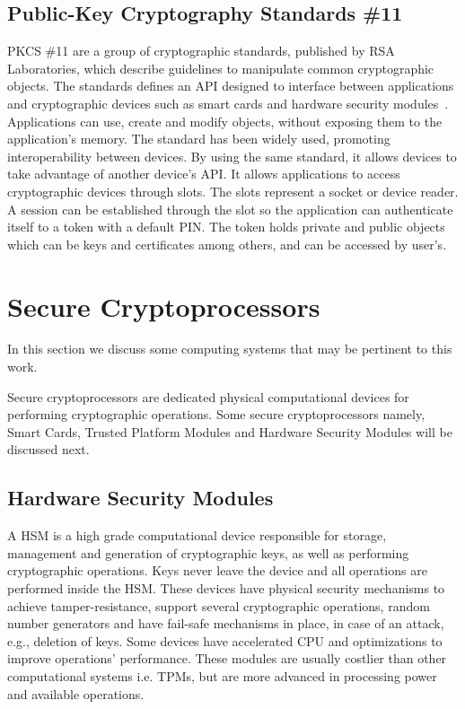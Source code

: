 \subsection{Public-Key Cryptography Standards \#11}
\ac{PKCS} \#11 are a group of cryptographic standards, published by RSA Laboratories, which describe guidelines to manipulate common cryptographic objects.
The standards defines an \ac{API} designed to interface between applications and cryptographic devices such as smart cards and hardware security modules~\cite{pkcs11analysis}. 
Applications can use, create and modify objects, without exposing them to the application's memory.
The standard has been widely used, promoting interoperability between devices. By using the same standard, it allows devices to take advantage of another device's \ac{API}.
It allows applications to access cryptographic devices through slots. The slots represent a socket or device reader. A session can be established through the slot so the application can authenticate itself to a token with a default \ac{PIN}. The token holds private and public objects which can be keys and certificates among others, and can be accessed by user's.
\section{Secure Cryptoprocessors}\label{chap:background:cryptoprocessors}

In this section we discuss some computing systems that may be pertinent to this work. 

Secure cryptoprocessors are dedicated physical computational devices for performing cryptographic operations. Some secure cryptoprocessors namely, Smart Cards, Trusted Platform Modules and Hardware Security Modules will be discussed next.

\subsection{Hardware Security Modules}\label{chap:background:computing:hsm}

A \ac{HSM} is a high grade computational device responsible for storage, management and generation of cryptographic keys, as well as performing cryptographic operations. Keys never leave the device and all operations are performed inside the \ac{HSM}. These devices have physical security mechanisms to achieve tamper-resistance, support several cryptographic operations, random number generators and have fail-safe mechanisms in place, in case of an attack, e.g., deletion of keys. Some devices have accelerated \ac{CPU} and optimizations to improve operations' performance.
These modules are usually costlier than other computational systems i.e. \ac{TPM}s, but are more advanced in processing power and available operations.

